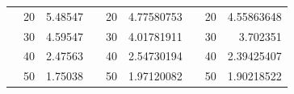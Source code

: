 \begin{table}[]
\begin{tabular}{|ccrccrccr|}
\rowcolor[HTML]{DDFDFF} 
\multicolumn{1}{|c|}{\cellcolor[HTML]{FFFFC7}}                                & \multicolumn{1}{c|}{\cellcolor[HTML]{DDFDFF}20}        & \multicolumn{1}{r|}{\cellcolor[HTML]{DDFDFF}5.48547}    & \multicolumn{1}{c|}{\cellcolor[HTML]{FFFFC7}}                                & \multicolumn{1}{c|}{\cellcolor[HTML]{DDFDFF}20}        & \multicolumn{1}{r|}{\cellcolor[HTML]{DDFDFF}4.77580753} & \multicolumn{1}{c|}{\cellcolor[HTML]{FFFFC7}}                                & \multicolumn{1}{c|}{\cellcolor[HTML]{DDFDFF}20}        & 4.55863648                                              \\ \cline{2-3} \cline{5-6} \cline{8-9} 
\rowcolor[HTML]{DAE8FC} 
\multicolumn{1}{|c|}{\cellcolor[HTML]{FFFFC7}}                                & \multicolumn{1}{c|}{\cellcolor[HTML]{DAE8FC}30}        & \multicolumn{1}{r|}{\cellcolor[HTML]{DAE8FC}4.59547}    & \multicolumn{1}{c|}{\cellcolor[HTML]{FFFFC7}}                                & \multicolumn{1}{c|}{\cellcolor[HTML]{DAE8FC}30}        & \multicolumn{1}{r|}{\cellcolor[HTML]{DAE8FC}4.01781911} & \multicolumn{1}{c|}{\cellcolor[HTML]{FFFFC7}}                                & \multicolumn{1}{c|}{\cellcolor[HTML]{DAE8FC}30}        & 3.702351                                                \\ \cline{2-3} \cline{5-6} \cline{8-9} 
\rowcolor[HTML]{DDFDFF} 
\multicolumn{1}{|c|}{\cellcolor[HTML]{FFFFC7}}                                & \multicolumn{1}{c|}{\cellcolor[HTML]{DDFDFF}40}        & \multicolumn{1}{r|}{\cellcolor[HTML]{DDFDFF}2.47563}    & \multicolumn{1}{c|}{\cellcolor[HTML]{FFFFC7}}                                & \multicolumn{1}{c|}{\cellcolor[HTML]{DDFDFF}40}        & \multicolumn{1}{r|}{\cellcolor[HTML]{DDFDFF}2.54730194} & \multicolumn{1}{c|}{\cellcolor[HTML]{FFFFC7}}                                & \multicolumn{1}{c|}{\cellcolor[HTML]{DDFDFF}40}        & 2.39425407                                              \\ \cline{2-3} \cline{5-6} \cline{8-9} 
\rowcolor[HTML]{DAE8FC} 
\multicolumn{1}{|c|}{\cellcolor[HTML]{FFFFC7}}                                & \multicolumn{1}{c|}{\cellcolor[HTML]{DAE8FC}50}        & \multicolumn{1}{r|}{\cellcolor[HTML]{DAE8FC}1.75038}    & \multicolumn{1}{c|}{\cellcolor[HTML]{FFFFC7}}                                & \multicolumn{1}{c|}{\cellcolor[HTML]{DAE8FC}50}        & \multicolumn{1}{r|}{\cellcolor[HTML]{DAE8FC}1.97120082} & \multicolumn{1}{c|}{\cellcolor[HTML]{FFFFC7}}                                & \multicolumn{1}{c|}{\cellcolor[HTML]{DAE8FC}50}        & 1.90218522                                              \\ \cline{2-3} \cline{5-6} \cline{8-9} 

\end{tabular}
\end{table}
